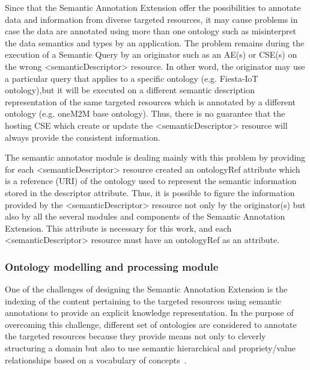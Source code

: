Since that the Semantic Annotation Extension offer the possibilities to annotate data and information from diverse targeted resources, it may cause problems in case the data are annotated using more than one ontology such as misinterpret the data semantics and types by an application. The problem remains during the execution of a Semantic Query by an originator such as an AE(s) or CSE(s) on the wrong <semanticDescriptor> resource. In other word, the originator may use a particular query that applies to a specific ontology (e.g. Fiesta-IoT ontology),but it will be executed on a different semantic description representation of the same targeted resources which is annotated by a different ontology (e.g. oneM2M base ontology). Thus, there is no guarantee that the hosting CSE which create or update the <semanticDescriptor> resource will always provide the consistent information.\par 
The semantic annotator module is dealing mainly with this problem by providing for each <semanticDescriptor> resource created an ontologyRef attribute which is a reference (URI) of the ontology used to represent the semantic information stored in the descriptor attribute. Thus, it is possible to figure the information provided by the <semanticDescriptor> resource not only by the originator(s) but also by all the several modules and components of the Semantic Annotation Extension. This attribute is necessary for this work, and each <semanticDescriptor> resource must have an ontologyRef as an attribute.




\subsubsection{Ontology modelling and processing module}

One of the challenges of designing the Semantic Annotation Extension is the indexing of the content pertaining to the targeted resources using semantic annotations to provide an explicit knowledge representation. In the purpose of overcoming this challenge, different set of ontologies are considered to annotate the targeted resources because they provide means not only to cleverly structuring a domain but also to use semantic hierarchical and propriety/value relationships based on a vocabulary of concepts~\cite{ontology}.\PAR

